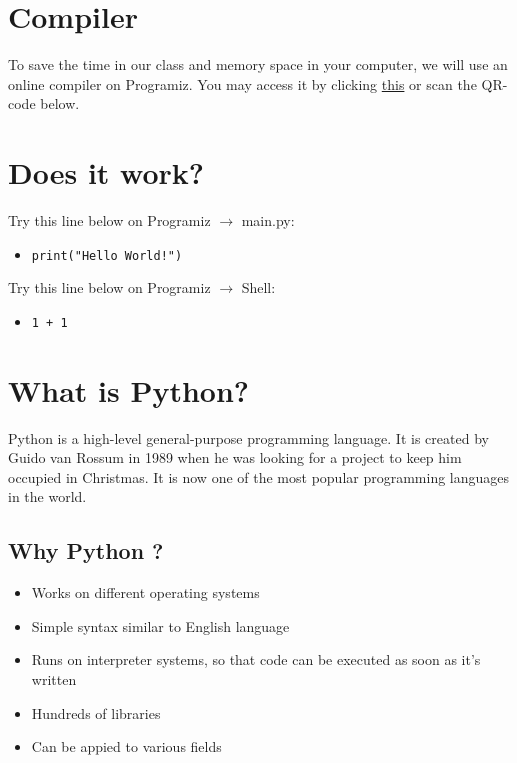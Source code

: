 \documentclass[12pt]{article}
\title{\kemin}
\author{臺大資管營教學團隊\quad Michael}
\date{2021.12.5}
\begin{document}
\begin{CJK*}{UTF8}{bkai}
\maketitle
\setcounter{section}{-2}
\section{Compiler}
To save the time in our class and memory space in your computer, we will use an online compiler on Programiz. You may access it by clicking {\color{blue}\href{https://www.programiz.com/python-programming/online-compiler/}{this}} or scan the QR-code below.
\begin{center}
\end{center}
\section{Does it work?}
Try this line below on Programiz $\rightarrow$ main.py:
\begin{itemize}
    \item \texttt{print("Hello World!")}
\end{itemize}
Try this line below on Programiz $\rightarrow$ Shell:
\begin{itemize}
    \item \texttt{1 + 1}
\end{itemize}

\section{What is Python?}
Python is a high-level general-purpose programming language. It is created by Guido 
van Rossum in 1989 when he was looking for a project to keep him occupied in 
Christmas. It is now one of the most popular programming languages in the world.

\subsection{Why Python ?}
\begin{itemize}
    \item Works on different operating systems
    \item Simple syntax similar to English language
    \item Runs on interpreter systems, so that code can be executed as soon as it's written
    \item Hundreds of libraries
    \item Can be appied to various fields
\end{itemize}


\end{CJK*}
\end{document}
